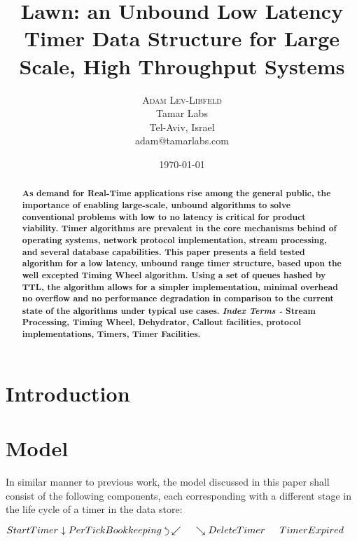 \documentclass[twocolumn,a4paper]{article}
\title{Lawn: an Unbound Low Latency Timer Data Structure for Large Scale, High Throughput Systems}
\author{
	\textsc{Adam Lev-Libfeld} \\[1ex]
	\normalsize Tamar Labs \\
	\normalsize Tel-Aviv, Israel \\
	\normalsize{adam@tamarlabs.com}
}
\date{\today}
\newcommand{\backtrackarrow}{\rotatebox[origin=c]{-90}{$\curvearrowleft$}}
\begin{document}
\maketitle

\begin{abstract}
\textbf{\noindent As demand for Real-Time applications rise among the general public, the importance of enabling large-scale, unbound algorithms to solve conventional problems with low to no latency is critical for product viability\cite{WHT}. Timer algorithms are prevalent in the core mechanisms behind of operating systems\cite{BSD}, network protocol implementation, stream processing, and several database capabilities. This paper presents a field tested algorithm for a low latency, unbound range timer structure, based upon the well excepted Timing Wheel algorithm. Using a set of queues hashed by TTL, the algorithm allows for a simpler implementation, minimal overhead no overflow and no performance degradation in comparison to the current state of the algorithms under typical use cases.}
\linebreak \linebreak
\textbf{\textit{Index Terms -} Stream Processing, Timing Wheel, Dehydrator, Callout facilities, protocol implementations, Timers, Timer Facilities.}
\end{abstract}


\section{Introduction}

\section{Model}
In similar manner to previous work\cite{TW}\cite{CQ}\cite{EMP}, the model discussed in this paper shall consist of the following components, each corresponding with a different stage in the life cycle of a timer in the data store:
\begin{center}
	$
	StartTimer \linebreak 
	\downarrow \linebreak  
	PerTickBookkeeping \hspace{1mm} \backtrackarrow \linebreak 
	\swarrow  \hspace{15pt}  \searrow \linebreak 
	DeleteTimer \hspace{15pt} TimerExpired
	$
	\vspace{3pt}
\end{center}
\end{document}
